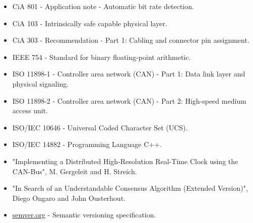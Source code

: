 \begin{itemize}
    \item CiA 801 - Application note - Automatic bit rate detection.
    \item CiA 103 - Intrinsically safe capable physical layer.
    \item CiA 303 - Recommendation - Part 1: Cabling and connector pin assignment.
    \item IEEE 754 - Standard for binary floating-point arithmetic.
    \item ISO 11898-1 - Controller area network (CAN) - Part 1: Data link layer and physical signaling.
    \item ISO 11898-2 - Controller area network (CAN) - Part 2: High-speed medium access unit.
    \item ISO/IEC 10646 - Universal Coded Character Set (UCS).
    \item ISO/IEC 14882 - Programming Language C++.
    \item "Implementing a Distributed High-Resolution Real-Time Clock using the CAN-Bus", M. Gergeleit and H. Streich.
    \item "In Search of an Understandable Consensus Algorithm (Extended Version)", Diego Ongaro and John Ousterhout.
    \item \href{http://semver.org}{semver.org} - Semantic versioning specification.
\end{itemize}
